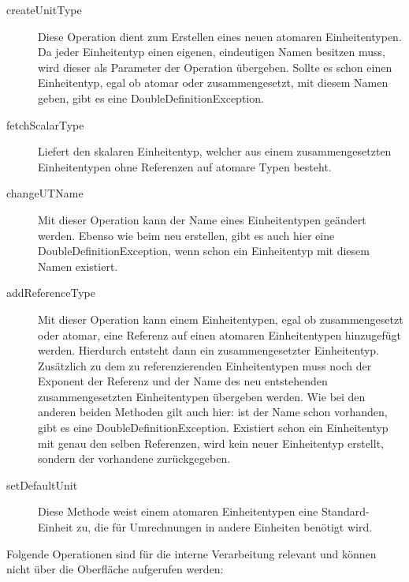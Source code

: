 \begin{description}
\item[createUnitType]
Diese Operation dient zum Erstellen eines neuen atomaren Einheitentypen. Da jeder Einheitentyp einen eigenen, eindeutigen Namen besitzen muss, wird dieser als Parameter der Operation übergeben. Sollte es schon einen Einheitentyp, egal ob atomar oder zusammengesetzt, mit diesem Namen geben, gibt es eine DoubleDefinitionException.
\item[fetchScalarType]
Liefert den skalaren Einheitentyp, welcher aus einem zusammengesetzten Einheitentypen ohne Referenzen auf atomare Typen besteht. 
\item[changeUTName]
Mit dieser Operation kann der Name eines Einheitentypen geändert werden. Ebenso wie beim neu erstellen, gibt es auch hier eine DoubleDefinitionException, wenn schon ein Einheitentyp mit diesem Namen existiert.
\item[addReferenceType]
Mit dieser Operation kann einem Einheitentypen, egal ob zusammengesetzt oder atomar, eine Referenz auf einen atomaren Einheitentypen hinzugefügt werden. Hierdurch entsteht dann ein zusammengesetzter Einheitentyp. Zusätzlich zu dem zu referenzierenden Einheitentypen muss noch der Exponent der Referenz und der Name des neu entstehenden zusammengesetzten Einheitentypen übergeben werden. Wie bei den anderen beiden Methoden gilt auch hier: ist der Name schon vorhanden, gibt es eine DoubleDefinitionException. Existiert schon ein Einheitentyp mit genau den selben Referenzen, wird kein neuer Einheitentyp erstellt, sondern der vorhandene zurückgegeben.
\item[setDefaultUnit]
Diese Methode weist einem atomaren Einheitentypen eine Standard-Einheit zu, die für Umrechnungen in andere Einheiten benötigt wird.
\end{description}

Folgende Operationen sind für die interne Verarbeitung relevant und können nicht über die Oberfläche aufgerufen werden:

